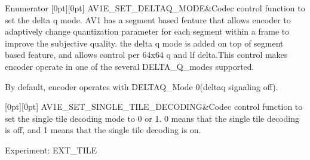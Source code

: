 \begin{DoxyEnumFields}{Enumerator}
[0pt][0pt]{}\mbox{\label{group__aom__encoder_ggae78dde67a6d78f332e9bdba0dde42db5ad26eda6211bf3d5fe4f5999ec52b264b}} 
A\+V1\+E\+\_\+\+S\+E\+T\+\_\+\+D\+E\+L\+T\+A\+Q\+\_\+\+M\+O\+DE&Codec control function to set the delta q mode. A\+V1 has a segment based feature that allows encoder to adaptively change quantization parameter for each segment within a frame to improve the subjective quality. the delta q mode is added on top of segment based feature, and allows control per 64x64 q and lf delta.\+This control makes encoder operate in one of the several D\+E\+L\+T\+A\+\_\+\+Q\+\_\+modes supported.

By default, encoder operates with D\+E\+L\+T\+A\+Q\+\_\+\+Mode 0(deltaq signaling off). \\
\hline

[0pt][0pt]{}\mbox{\label{group__aom__encoder_ggae78dde67a6d78f332e9bdba0dde42db5af341538631ffe2ac2b562c8b5336a10a}} 
A\+V1\+E\+\_\+\+S\+E\+T\+\_\+\+S\+I\+N\+G\+L\+E\+\_\+\+T\+I\+L\+E\+\_\+\+D\+E\+C\+O\+D\+I\+NG&Codec control function to set the single tile decoding mode to 0 or 1. 0 means that the single tile decoding is off, and 1 means that the single tile decoding is on.

Experiment\+: E\+X\+T\+\_\+\+T\+I\+LE \\
\hline


\end{DoxyEnumFields}
